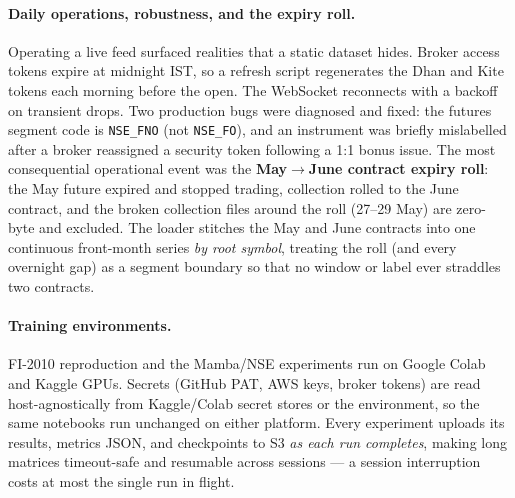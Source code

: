 \documentclass[11pt]{article}
\begin{document}
\paragraph{Daily operations, robustness, and the expiry roll.}
Operating a live feed surfaced realities that a static dataset hides. Broker access tokens expire at
midnight IST, so a refresh script regenerates the Dhan and Kite tokens each morning before the open. The
WebSocket reconnects with a backoff on transient drops. Two production bugs were diagnosed and fixed: the
futures segment code is \texttt{NSE\_FNO} (not \texttt{NSE\_FO}), and an instrument was briefly mislabelled
after a broker reassigned a security token following a 1:1 bonus issue. The most consequential operational
event was the \textbf{May$\rightarrow$June contract expiry roll}: the May future expired and stopped trading,
collection rolled to the June contract, and the broken collection files around the roll (27--29 May) are
zero-byte and excluded. The loader stitches the May and June contracts into one continuous front-month series
\emph{by root symbol}, treating the roll (and every overnight gap) as a segment boundary so that no
window or label ever straddles two contracts.

\paragraph{Training environments.}
FI-2010 reproduction and the Mamba/NSE experiments run on Google Colab and Kaggle GPUs. Secrets (GitHub PAT,
AWS keys, broker tokens) are read host-agnostically from Kaggle/Colab secret stores or the environment, so the
same notebooks run unchanged on either platform. Every experiment uploads its results, metrics JSON, and
checkpoints to S3 \emph{as each run completes}, making long matrices timeout-safe and resumable across
sessions --- a session interruption costs at most the single run in flight.
\end{document}
